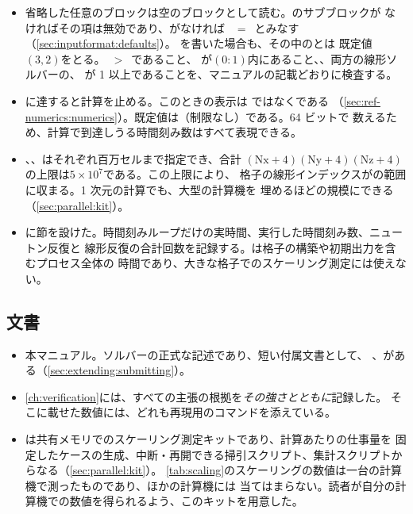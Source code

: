 \begin{itemize}
    テーブル）があると、その完全なパスと意図したと思われる名前を示して計算を止める
    （\cref{sec:inputformat:unknown}）。を使えば、計算を実行せずに
    この検査とほかの検査を行える。
  \item 省略した任意のブロックは空のブロックとして読む。のサブブロックが
    なければその項は無効であり、がなければ
    ~$=$~とみなす（\cref{sec:inputformat:defaults}）。
    を書いた場合も、その中のとは
    既定値$(3,2)$をとる。~$>$~であること、
    が$(0:1)$内にあること、、両方の線形ソルバーの、
    が 1 以上であることを、マニュアルの記載どおりに検査する。
  \item {}に達すると計算を止める。このときの表示は
    ではなくである
    （\cref{sec:ref-numerics:numerics}）。既定値は（制限なし）である。64 ビットで
    数えるため、計算で到達しうる時間刻み数はすべて表現できる。
  \item {}、、はそれぞれ百万セルまで指定でき、合計
    $(\mathrm{Nx}+4)(\mathrm{Ny}+4)(\mathrm{Nz}+4)$の上限は$5\times10^{7}$である。この上限により、
    格子の線形インデックスがの範囲に収まる。1 次元の計算でも、大型の計算機を
    埋めるほどの規模にできる（\cref{sec:parallel:kit}）。
  \item {}に節を設けた。時間刻みループだけの実時間、実行した時間刻み数、ニュートン反復と
    線形反復の合計回数を記録する。は格子の構築や初期出力を含むプロセス全体の
    時間であり、大きな格子でのスケーリング測定には使えない。
\end{itemize}

\subsection*{文書}

\begin{itemize}
  \item 本マニュアル。ソルバーの正式な記述であり、短い付属文書として、
    、がある（\cref{sec:extending:submitting}）。
  \item \cref{ch:verification}には、すべての主張の根拠を\emph{その強さとともに}記録した。
    そこに載せた数値には、どれも再現用のコマンドを添えている。
  \item {}は共有メモリでのスケーリング測定キットであり、計算あたりの仕事量を
    固定したケースの生成、中断・再開できる掃引スクリプト、集計スクリプトからなる（\cref{sec:parallel:kit}）。
    \cref{tab:scaling}のスケーリングの数値は一台の計算機で測ったものであり、ほかの計算機には
    当てはまらない。読者が自分の計算機での数値を得られるよう、このキットを用意した。
\end{itemize}

